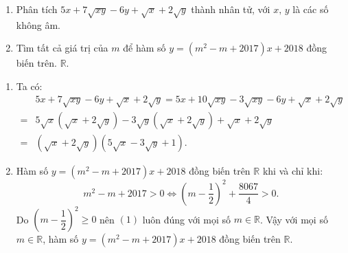 \begin{ex}%
    \hfill
    \begin{enumerate}
        \item Phân tích $5x+7\sqrt{xy}-6y+\sqrt{x}+2\sqrt{y}$ thành nhân tử, với $x,\,y$ là các số không âm.
        \item Tìm tất cả giá trị của $m$ để hàm số $y=\left( m^2-m+2017 \right)x+2018$ đồng biến trên. $\mathbb{R}$.
    \end{enumerate}
\loigiai
    {
    \begin{enumerate}
        \item Ta có:
         {\allowdisplaybreaks
         	\begin{align*}
         	&5x+7\sqrt{xy}-6y+\sqrt{x}+2\sqrt{y} = 5x+10\sqrt{xy}-3\sqrt{xy}-6y+\sqrt{x}+2\sqrt{y}\\
        =&5\sqrt{x}\left( \sqrt{x}+2\sqrt{y} \right)-3\sqrt{y}\left( \sqrt{x}+2\sqrt{y} \right)+\sqrt{x}+2\sqrt{y}\\
        =&\left( \sqrt{x}+2\sqrt{y} \right)\left( 5\sqrt{x}-3\sqrt{y}+1 \right).
       \end{align*}} 
        \item Hàm số $y=\left( m^2-m+2017 \right)x+2018$ đồng biến trên $\mathbb{R}$ khi và chỉ khi:
        \[m^2-m+2017>0 \Leftrightarrow \left( m-\frac{1}{2} \right)^2+\frac{8067}{4}>0.\tag{1}\]
        Do $\left( m-\dfrac{1}{2} \right)^2\ge 0$ nên $(1)$ luôn đúng với mọi số $m\in \mathbb{R}$. Vậy với mọi số $m\in \mathbb{R}$, hàm số $y=\left( m^2-m+2017 \right)x+2018$ đồng biến trên $\mathbb{R}$.
     \end{enumerate}
    }
\end{ex}

